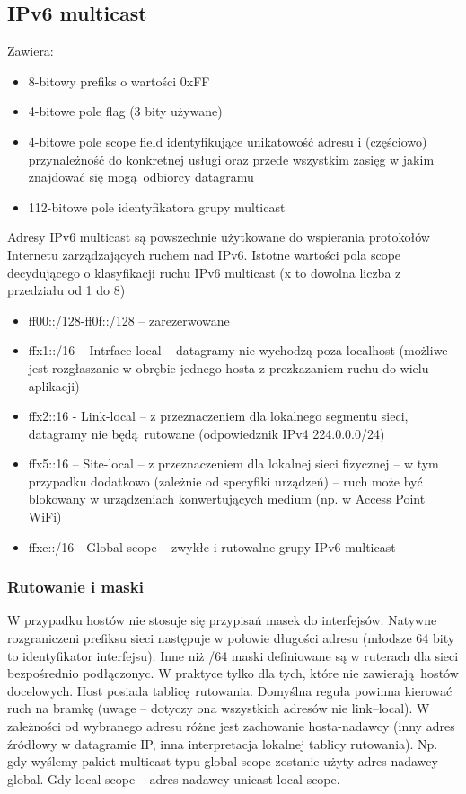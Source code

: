 \documentclass[a4paper, 12pt, titlepage]{article}
\begin{document}
			\subsection{IPv6 multicast}
				Zawiera:
				\begin{itemize}
					\item 8-bitowy prefiks o wartości 0xFF
					\item 4-bitowe pole flag (3 bity używane)
					\item 4-bitowe pole scope field identyfikujące unikatowość adresu i (częściowo) przynależność do konkretnej usługi oraz przede wszystkim zasięg w jakim znajdować się mogą odbiorcy datagramu
					\item 112-bitowe pole identyfikatora grupy multicast
				\end{itemize}
				Adresy IPv6 multicast są powszechnie użytkowane do wspierania protokołów Internetu zarządzających ruchem nad IPv6.
				\newline \newline
				Istotne wartości pola scope decydującego o klasyfikacji ruchu IPv6 multicast (x to dowolna liczba z przedziału od 1 do 8)
				\begin{itemize}
					\item ff00::/128-ff0f::/128 -- zarezerwowane
					\item ffx1::/16 -- Intrface-local -- datagramy nie wychodzą poza localhost (możliwe jest rozgłaszanie w obrębie jednego hosta z prezkazaniem ruchu do wielu aplikacji)
					\item ffx2::16 - Link-local -- z przeznaczeniem dla lokalnego segmentu sieci, datagramy nie będą rutowane (odpowiedznik IPv4 224.0.0.0/24)
					\item ffx5::16 -- Site-local -- z przeznaczeniem dla lokalnej sieci fizycznej -- w tym przypadku dodatkowo (zależnie od specyfiki urządzeń) -- ruch może być blokowany w urządzeniach konwertujących medium (np. w Access Point WiFi)
					\item ffxe::/16 - Global scope -- zwykłe i rutowalne grupy IPv6 multicast
				\end{itemize}
			\subsubsection{Rutowanie i maski}
				W przypadku hostów nie stosuje się przypisań masek do interfejsów. Natywne rozgraniczeni prefiksu sieci następuje w połowie długości adresu (młodsze 64 bity to identyfikator interfejsu). Inne niż /64 maski definiowane są w ruterach dla sieci bezpośrednio podłączonyc. W praktyce tylko dla tych, które nie zawierają hostów docelowych.
				\newline 
				\newline
				Host posiada tablicę rutowania. Domyślna reguła powinna kierować ruch na bramkę (uwage -- dotyczy ona wszystkich adresów nie link--local). W zależności od wybranego adresu różne jest zachowanie hosta-nadawcy (inny adres źródłowy w datagramie IP, inna interpretacja lokalnej tablicy rutowania). Np. gdy wyślemy pakiet multicast typu global scope zostanie użyty adres nadawcy global. Gdy local scope -- adres nadawcy unicast local scope.
\end{document}
